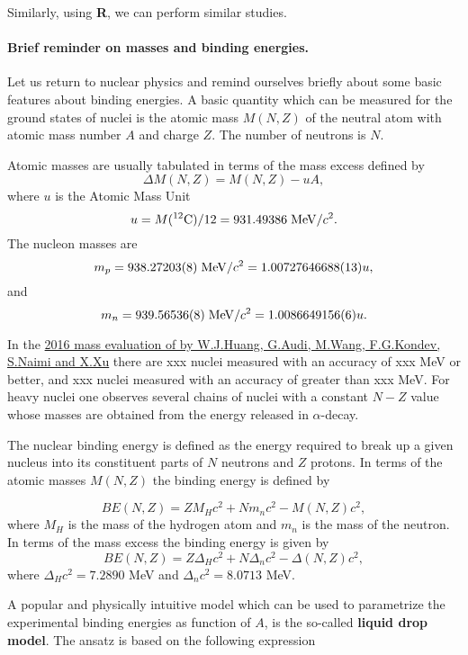\documentclass[%
oneside,                 %
final,                   %
10pt]{article}
\begin{document}
Similarly, using \textbf{R}, we can perform similar studies. 





\paragraph{Brief reminder on masses and binding energies.}
Let us return to nuclear physics and remind ourselves briefly about some basic features about binding
energies.  A basic quantity which can be measured for the ground
states of nuclei is the atomic mass $M(N, Z)$ of the neutral atom with
atomic mass number $A$ and charge $Z$. The number of neutrons is $N$.

Atomic masses are usually tabulated in terms of the mass excess defined by
\[
\Delta M(N, Z) =  M(N, Z) - uA,
\]
where $u$ is the Atomic Mass Unit 
\[
u = M(^{12}\mathrm{C})/12 = 931.49386 \hspace{0.1cm} \mathrm{MeV}/c^2.
\]
The nucleon masses are
\[
m_p = 938.27203(8)\hspace{0.1cm} \mathrm{MeV}/c^2 = 1.00727646688(13)u,
\] 
and
\[
m_n = 939.56536(8)\hspace{0.1cm} \mathrm{MeV}/c^2 = 1.0086649156(6)u.
\]

In the \href{{http://nuclearmasses.org/resources_folder/Wang_2017_Chinese_Phys_C_41_030003.pdf}}{2016 mass evaluation of by W.J.Huang, G.Audi, M.Wang, F.G.Kondev, S.Naimi and X.Xu}
there are xxx nuclei measured with an
accuracy of xxx MeV or better, and xxx nuclei measured with an
accuracy of greater than xxx MeV. For heavy nuclei one observes
several chains of nuclei with a constant $N-Z$ value whose masses are
obtained from the energy released in $\alpha$-decay.


The nuclear binding energy is defined as the energy required to break
up a given nucleus into its constituent parts of $N$ neutrons and $Z$
protons. In terms of the atomic masses $M(N, Z)$ the binding energy is
defined by


\[
BE(N, Z) = ZM_H c^2 + Nm_n c^2 - M(N, Z)c^2 ,
\]
where $M_H$ is the mass of the hydrogen atom and $m_n$ is the mass of the neutron.
In terms of the mass excess the binding energy is given by
\[
BE(N, Z) = Z\Delta_H c^2 + N\Delta_n c^2 -\Delta(N, Z)c^2 ,
\]
where $\Delta_H c^2 = 7.2890$ MeV and $\Delta_n c^2 = 8.0713$ MeV.


A popular and physically intuitive model which can be used to parametrize 
the experimental binding energies as function of $A$, is the so-called 
\textbf{liquid drop model}. The ansatz is based on the following expression
\end{document}
